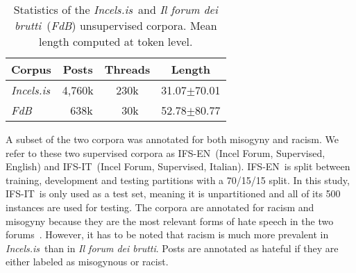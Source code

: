 \documentclass[11pt]{article}
\newcommand{\todoA}[1]{\todo[color=blue!40]{A: #1}}
\newcommand{\dsENclassification}{IFS-EN}
\newcommand{\dsITclassification}{IFS-IT}
\newcommand{\enforum}{\textit{Incels.is}}
\newcommand{\itforum}{\textit{Il forum dei brutti}}
\begin{document}
\renewcommand{\arraystretch}{0.9}

\begin{table}[t]
  \centering
  \caption{Statistics of the \enforum\, and \itforum\, (\textit{FdB}) unsupervised corpora. Mean length computed at token level.}
  \begin{tabular}{l|ccc}
      \hline
      \textbf{Corpus} & \textbf{Posts} & \textbf{Threads} & \textbf{Length} \\
      \hline
      \enforum & 4,760k & 230k & 31.07$\pm$70.01 \\
      \textit{FdB} & \,\,\,\,638k & \,\,\,30k & 52.78$\pm$80.77 \\
      \hline
  \end{tabular}
  \label{tab:english-italian-unsupervised-datasets-stats}
\end{table}

A subset of the two corpora was annotated for both misogyny and racism.
We refer to these two supervised corpora as \dsENclassification\, (Incel Forum, Supervised, English) and \dsITclassification\, (Incel Forum, Supervised, Italian). \dsENclassification~is split between training, development and testing partitions with a 70/15/15 split. In this study, \dsITclassification~is only used as a test set, meaning it is unpartitioned and all of its 500 instances are used for testing.
The corpora are annotated for racism and misogyny because they are the most relevant forms of hate speech in the two forums~\cite{silva2016analyzing,ging2018special}. However, it has to be noted that racism is much more prevalent in \enforum\, than in \itforum. Posts are annotated as hateful if they are either labeled as misogynous or racist.
\end{document}
